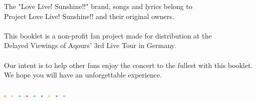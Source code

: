 \ifdefined\COMPLETE
\else
	
	
\fi
\def\pagetitletext{}

\thispagestyle{empty}

\vspace*{\fill}
\begin{center}\footnotesize
The "Love Live! Sunshine!!" brand, songs and lyrics belong to\\Project Love Live! Sunshine!! and their original owners.\\
~\\
This booklet is a non-profit fan project made for distribution at the\\Delayed Viewings of Aqours' 3rd Live Tour in Germany.\\
~\\
Our intent is to help other fans enjoy the concert to the fullest with this booklet.\\We hope you will have an unforgettable experience.\\
~\\
\includegraphics[height=1mm,keepaspectratio]{images/dots_color.pdf}
\end{center}
